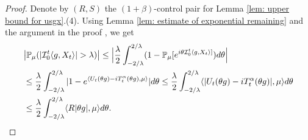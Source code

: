 \documentclass[12pt]{amsart}
\theoremstyle{plain}
\theoremstyle{definition}
\numberwithin{equation}{section}
\begin{document}
\begin{proof}
    Denote by $(R,S)$ the $(1+\beta)$-control pair for Lemma \ref{lem: upper bound for usgx}.(4).
    Using Lemma \ref{lem: estimate of exponential remaining} and the argument in the proof \cite[Theorem 3.3.6]{Durrett2010Probability}, we get
\begin{align}
    &\big|\mathbb P_\mu (|\mathcal{I}_0^t\langle g,X_t\rangle| > \lambda)\big|
    \leq \Big|\frac{\lambda}{2}\int_{-2/\lambda}^{2/\lambda}(1 - \mathbb P_\mu[e^{i\theta \mathcal{I}_0^t\langle g,X_t\rangle]})d\theta\Big|
    \\&\leq \frac{\lambda}{2}\int_{-2/\lambda}^{2/\lambda}|1-e^{\langle U_t(\theta g)-iT_t^{\alpha}(\theta g),\mu \rangle}|d\theta
    \leq \frac{\lambda}{2}\int_{-2/\lambda}^{2/\lambda}\langle |U_t(\theta g) - iT_t^\alpha(\theta g)|,\mu\rangle d\theta
    \\&\leq \frac{\lambda}{2}\int_{-2/\lambda}^{2/\lambda}\langle R|\theta g|,\mu\rangle d\theta.
      \qedhere
\end{align}
\end{proof}
\end{document}
